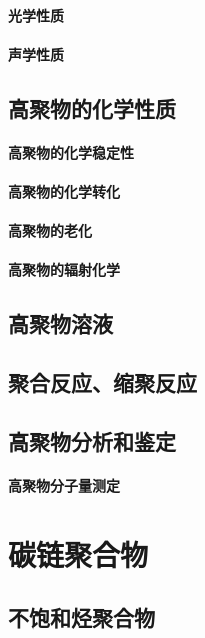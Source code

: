 \documentclass[UTF8]{../03-Chemistry}
\begin{document}
    \subsubsection{光学性质}
    \subsubsection{声学性质}
\section{高聚物的化学性质}
    \subsubsection{高聚物的化学稳定性}
    \subsubsection{高聚物的化学转化}
    \subsubsection{高聚物的老化}
    \subsubsection{高聚物的辐射化学}
\section{高聚物溶液}
\section{聚合反应、缩聚反应}
\section{高聚物分析和鉴定}
    \subsubsection{高聚物分子量测定}








\chapter{碳链聚合物}
\section{不饱和烃聚合物}
\end{document}
